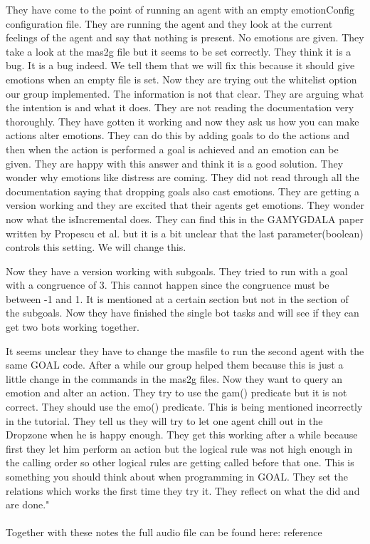 \documentclass[11pt]{article}
\begin{document}
\begin{appendices}
	They have come to the point of running an agent with an empty emotionConfig configuration file. They are running the agent and they look at the current feelings of the agent and say that nothing is present. No emotions are given. They take a look at the mas2g file but it seems to be set correctly. They think it is a bug. It is a bug indeed. We tell them that we will fix this because it should give emotions when an empty file is set. Now they are trying out the whitelist option our group implemented. The information is not that clear. They are arguing what the intention is and what it does. They are not reading the documentation very thoroughly. They have gotten it working and now they ask us how you can make actions alter emotions. They can do this by adding goals to do the actions and then when the action is performed a goal is achieved and an emotion can be given. They are happy with this answer and think it is a good solution. They wonder why emotions like distress are coming. They did not read through all the documentation saying that dropping goals also cast emotions. They are getting a version working and they are excited that their agents get emotions. They wonder now what the isIncremental does. They can find this in the GAMYGDALA paper written by Propescu et al.\cite{GAMYGDALA paper} but it is a bit unclear that the last parameter(boolean) controls this setting. We will change this. \par Now they have a version working with subgoals. They tried to run with a goal with a congruence of 3. This cannot happen since the congruence must be between -1 and 1. It is mentioned at a certain section but not in the section of the subgoals. Now they have finished the single bot tasks and will see if they can get two bots working together.\par It seems unclear they have to change the masfile to run the second agent with the same GOAL code. After a while our group helped them because this is just a little change in the commands in the mas2g files. Now they want to query an emotion and alter an action. They try to use the gam() predicate but it is not correct. They should use the emo() predicate. This is being mentioned incorrectly in the tutorial. They tell us they will try to let one agent chill out in the Dropzone when he is happy enough. They get this working after a while because first they let him perform an action but the logical rule was not high enough in the calling order so other logical rules are getting called before that one. This is something you should think about when programming in GOAL. They set the relations which works the first time they try it. They reflect on what the did and are done."\\
	\\
	Together with these notes the full audio file can be found here:
	reference
\end{appendices}
\end{document}

